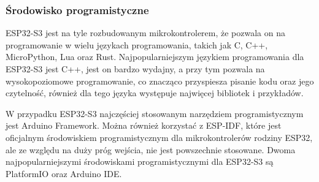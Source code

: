 \documentclass[../main.tex]{subfiles}
\begin{document}
\subsubsection{Środowisko programistyczne}
\label{sec:srodowisko_programistyczne}
ESP32-S3 jest na tyle rozbudowanym mikrokontrolerem, że pozwala on na programowanie w wielu językach programowania, takich jak C, C++, MicroPython, Lua oraz Rust.
Najpopularniejszym językiem programowania dla ESP32-S3 jest C++, jest on bardzo wydajny, a przy tym pozwala na wysokopoziomowe programowanie, 
co znacząco przyspiesza pisanie kodu oraz jego czytelność, również dla tego języka występuje najwięcej bibliotek i przykładów.

W przypadku ESP32-S3 najczęściej stosowanym narzędziem programistycznym jest Arduino Framework. Można również korzystać z ESP-IDF,
które jest oficjalnym środowiskiem programistycznym dla mikrokontrolerów rodziny ESP32, ale ze względu na duży próg wejścia, nie jest powszechnie stosowane.
 Dwoma najpopularniejszymi środowiskami programistycznymi dla ESP32-S3 są PlatformIO oraz Arduino IDE.
\end{document}

